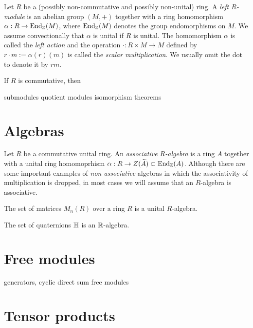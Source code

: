 \documentclass{../../large}
\begin{document}
\begin{prb}
Let $R$ be a (possibly non-commutative and possibly non-unital) ring.
A \emph{left $R$-module} is an abelian group $(M,+)$ together with a ring homomorphism $\alpha:R\to\operatorname{End}_{\mathbb{Z}}(M)$, where $\operatorname{End}_{\mathbb{Z}}(M)$ denotes the group endomorphisms on $M$.
We assume convectionally that $\alpha$ is unital if $R$ is unital.
The homomorphism $\alpha$ is called the \emph{left action} and the operation $\cdot:R\times M\to M$ defined by $r\cdot m:=\alpha(r)(m)$ is called the \emph{scalar multiplication}.
We usually omit the dot to denote it by $rm$.
\begin{parts}
\item If $R$ is commutative, then
\end{parts}
\end{prb}

submodules
quotient modules
isomorphism theorems


\section{Algebras}
\begin{prb}
Let $R$ be a commutative unital ring.
An \emph{associative $R$-algebra} is a ring $A$ together with a unital ring homomoprhism $\alpha:R\to Z(\widetilde A)\subset\operatorname{End}_{\mathbb{Z}}(A)$.
Although there are some important examples of \emph{non-associative} algebras in which the associativity of multiplication is dropped, in most cases we will assume that an $R$-algebra is associative.
\begin{parts}
\item The set of matrices $M_n(R)$ over a ring $R$ is a unital $R$-algebra.
\item The set of quaternions $\mathbb{H}$ is an $\mathbb{R}$-algebra.
\end{parts}
\end{prb}




\section{Free modules}
generators, cyclic
direct sum
free modules

\section{Tensor products}
\end{document}
